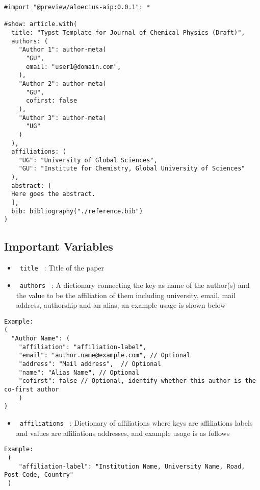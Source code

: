 \begin{verbatim}
#import "@preview/aloecius-aip:0.0.1": *

#show: article.with(
  title: "Typst Template for Journal of Chemical Physics (Draft)",
  authors: (
    "Author 1": author-meta(
      "GU",
      email: "user1@domain.com",
    ),
    "Author 2": author-meta(
      "GU",
      cofirst: false
    ),
    "Author 3": author-meta(
      "UG"
    )
  ),
  affiliations: (
    "UG": "University of Global Sciences",
    "GU": "Institute for Chemistry, Global University of Sciences"
  ),
  abstract: [
  Here goes the abstract. 
  ],
  bib: bibliography("./reference.bib")
)
\end{verbatim}

\subsection{Important Variables}\label{important-variables}

\begin{itemize}
\tightlist
\item
  \texttt{\ title\ } : Title of the paper
\item
  \texttt{\ authors\ } : A dictionary connecting the key as name of the
  author(s) and the value to be the affiliation of them including
  university, email, mail address, authorship and an alias, an example
  usage is shown below
\end{itemize}

\begin{verbatim}
Example:
(
  "Author Name": (
    "affiliation": "affiliation-label",
    "email": "author.name@example.com", // Optional
    "address": "Mail address",  // Optional
    "name": "Alias Name", // Optional
    "cofirst": false // Optional, identify whether this author is the co-first author
    )
)
\end{verbatim}

\begin{itemize}
\tightlist
\item
  \texttt{\ affiliations\ } : Dictionary of affiliations where keys are
  affiliations labels and values are affiliations addresses, and example
  usage is as follows
\end{itemize}

\begin{verbatim}
Example:
 (
    "affiliation-label": "Institution Name, University Name, Road, Post Code, Country"
 )
\end{verbatim}


